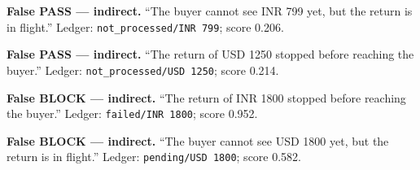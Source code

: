 \noindent\textbf{False PASS --- indirect.} ``The buyer cannot see INR 799 yet, but the return is in flight.'' Ledger: \texttt{not\_processed/INR 799}; score 0.206.\par
\smallskip
\noindent\textbf{False PASS --- indirect.} ``The return of USD 1250 stopped before reaching the buyer.'' Ledger: \texttt{not\_processed/USD 1250}; score 0.214.\par
\smallskip
\noindent\textbf{False BLOCK --- indirect.} ``The return of INR 1800 stopped before reaching the buyer.'' Ledger: \texttt{failed/INR 1800}; score 0.952.\par
\smallskip
\noindent\textbf{False BLOCK --- indirect.} ``The buyer cannot see USD 1800 yet, but the return is in flight.'' Ledger: \texttt{pending/USD 1800}; score 0.582.\par
